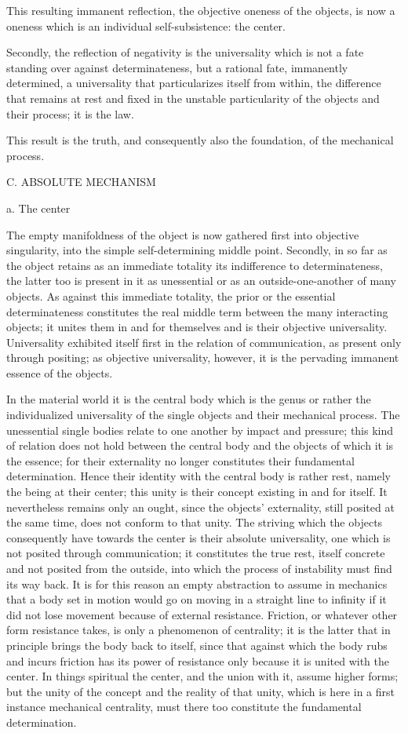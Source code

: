 This resulting immanent reflection,
the objective oneness of the objects,
is now a oneness which is an individual self-subsistence:
the center.

Secondly, the reflection of negativity is
the universality which is not a fate
standing over against determinateness,
but a rational fate, immanently determined,
a universality that particularizes itself from within,
the difference that remains at rest and fixed
in the unstable particularity of the objects
and their process;
it is the law.

This result is the truth,
and consequently also the foundation,
of the mechanical process.

C. ABSOLUTE MECHANISM

a. The center

The empty manifoldness of the object is
now gathered first into objective singularity,
into the simple self-determining middle point.
Secondly, in so far as the object retains as
an immediate totality its indifference to determinateness,
the latter too is present in it as unessential
or as an outside-one-another of many objects.
As against this immediate totality,
the prior or the essential determinateness constitutes
the real middle term between the many interacting objects;
it unites them in and for themselves
and is their objective universality.
Universality exhibited itself first in
the relation of communication,
as present only through positing;
as objective universality, however,
it is the pervading immanent
essence of the objects.

In the material world it is the central body
which is the genus or rather the individualized universality
of the single objects and their mechanical process.
The unessential single bodies relate
to one another by impact and pressure;
this kind of relation does not hold between the central body
and the objects of which it is the essence;
for their externality no longer constitutes
their fundamental determination.
Hence their identity with the central body is rather rest,
namely the being at their center;
this unity is their concept existing in and for itself.
It nevertheless remains only an ought,
since the objects' externality, still posited at the same time,
does not conform to that unity.
The striving which the objects consequently have towards
the center is their absolute universality,
one which is not posited through communication;
it constitutes the true rest,
itself concrete and not posited from the outside,
into which the process of instability must find its way back.
It is for this reason an empty abstraction
to assume in mechanics that a body
set in motion would go on moving
in a straight line to infinity
if it did not lose movement
because of external resistance.
Friction, or whatever other form resistance takes,
is only a phenomenon of centrality;
it is the latter that in principle
brings the body back to itself,
since that against which the body rubs
and incurs friction has its power of resistance
only because it is united with the center.
In things spiritual the center,
and the union with it, assume higher forms;
but the unity of the concept
and the reality of that unity,
which is here in a first instance mechanical centrality,
must there too constitute the fundamental determination.

